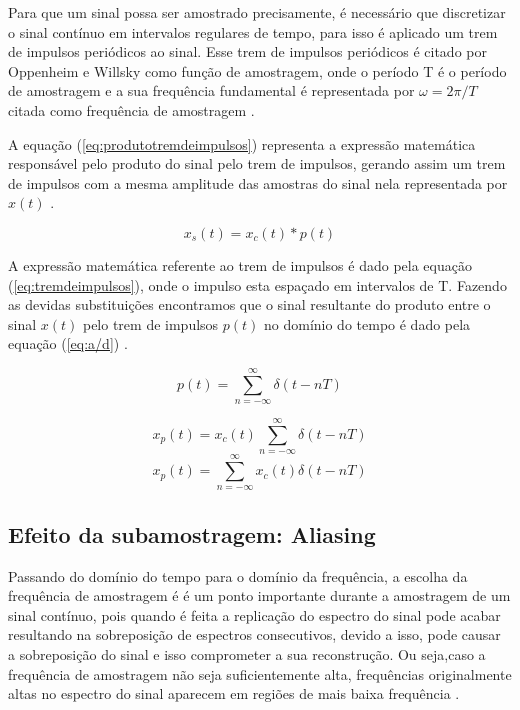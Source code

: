 \documentclass[journal]{IEEEtran}
\begin{document}
Para que um sinal possa ser amostrado precisamente, é necessário que discretizar o sinal contínuo em intervalos regulares de tempo, para isso é aplicado um trem de impulsos periódicos ao sinal\cite{Oppenheim}\cite{alan}. Esse trem de impulsos periódicos é citado por Oppenheim e Willsky \cite{alan} como função de amostragem, onde o período T é o período de amostragem e a sua frequência fundamental é representada por $\omega = 2\pi/T$ citada como frequência de amostragem \cite{alan}. 

A equação (\ref{eq:produtotremdeimpulsos}) representa a expressão matemática responsável pelo produto do sinal pelo trem de impulsos, gerando assim um trem de impulsos com a mesma amplitude das amostras do sinal nela representada por $x(t)$ \cite{alan}.

\begin{equation}\label{eq:produtotremdeimpulsos}
    x_{s}(t) = x_{c}(t) * p(t)
\end{equation}

A expressão matemática referente ao trem de impulsos é dado pela equação (\ref{eq:tremdeimpulsos}), onde o impulso esta espaçado em intervalos de T. Fazendo as devidas substituições encontramos que o sinal resultante do produto entre o sinal $x(t)$ pelo trem de impulsos $p(t)$ no domínio do tempo é dado pela equação (\ref{eq:a/d}) \cite{alan} \cite{Oppenheim}.

\begin{equation}\label{eq:tremdeimpulsos}
    p(t) = \sum_{n=-\infty}^{\infty} \delta(t - nT)
\end{equation}

\begin{equation}\label{eq:a/d}
    x_{p}(t) = x_{c}(t) \sum_{n=-\infty}^{\infty} \delta(t - nT)
\end{equation}
\begin{equation*}
    x_{p}(t) = \sum_{n=-\infty}^{\infty} x_{c}(t) \delta(t - nT)
\end{equation*}

\subsection{Efeito da subamostragem: Aliasing}

Passando do domínio do tempo para o domínio da frequência, a escolha da frequência de amostragem é é um ponto importante durante a amostragem de um sinal contínuo, pois quando é feita a replicação do espectro do sinal pode acabar resultando na sobreposição de espectros consecutivos, devido a isso, pode causar a sobreposição do sinal e isso comprometer a sua reconstrução. Ou seja,caso a frequência de amostragem não seja suficientemente alta, frequências originalmente altas no espectro do sinal aparecem em regiões de mais baixa frequência \cite{Oppenheim} \cite{alan}. 
\end{document}
